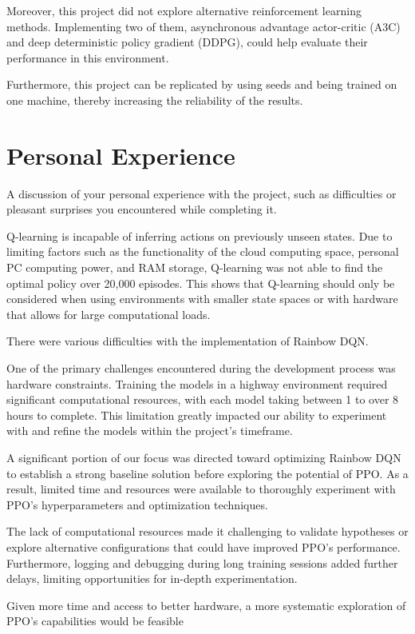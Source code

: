 \documentclass{article}
\begin{document}
Moreover, this project did not explore alternative reinforcement learning methods. Implementing two of them, asynchronous advantage actor-critic (A3C) and deep deterministic policy gradient (DDPG), could help evaluate their performance in this environment.


Furthermore, this project can be replicated by using seeds and being trained on one machine, thereby increasing the reliability of the results.


\section{Personal Experience}
A discussion of your personal experience with the project, such as difficulties or pleasant surprises you encountered while completing it.

Q-learning is incapable of inferring actions on previously unseen states. Due to limiting factors such as the functionality of the cloud computing space, personal PC computing power, and RAM storage, Q-learning was not able to find the optimal policy over 20,000 episodes. This shows that Q-learning should only be considered when using environments with smaller state spaces or with hardware that allows for large computational loads. 

There were various difficulties with the implementation of Rainbow DQN.

One of the primary challenges encountered during the development process was hardware constraints. Training the models in a highway environment required significant computational resources, with each model taking between 1 to over 8 hours to complete. This limitation greatly impacted our ability to experiment with and refine the models within the project’s timeframe.

A significant portion of our focus was directed toward optimizing Rainbow DQN to establish a strong baseline solution before exploring the potential of PPO. As a result, limited time and resources were available to thoroughly experiment with PPO’s hyperparameters and optimization techniques. 

The lack of computational resources made it challenging to validate hypotheses or explore alternative configurations that could have improved PPO’s performance. Furthermore, logging and debugging during long training sessions added further delays, limiting opportunities for in-depth experimentation.

Given more time and access to better hardware, a more systematic exploration of PPO’s capabilities would be feasible
\end{document}
